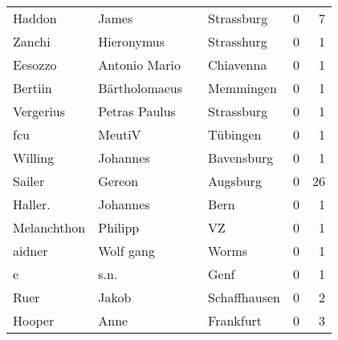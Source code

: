 \begin{tabular}{llllrr}
                   Haddon &                              James &             &                                  Strassburg &          0 &         7 \\
                   Zanchi &                         Hieronymus &             &                                  Strasshurg &          0 &         1 \\
                  Eesozzo &                      Antonio Mario &             &                                   Chiavenna &          0 &         1 \\
                  Bertiin &                      Bärtholomaeus &             &                                   Memmingen &          0 &         1 \\
                Vergerius &                      Petras Paulus &             &                                  Strassburg &          0 &         1 \\
                      fcu &                             MeutiV &             &                                    Tübingen &          0 &         1 \\
                  Willing &                           Johannes &             &                                  Bavensburg &          0 &         1 \\
                   Sailer &                             Gereon &             &                                    Augsburg &          0 &        26 \\
                  Haller. &                           Johannes &             &                                        Bern &          0 &         1 \\
              Melanchthon &                            Philipp &             &                                          VZ &          0 &         1 \\
                   aidner &                          Wolf gang &             &                                       Worms &          0 &         1 \\
                        e &                               s.n. &             &                                        Genf &          0 &         1 \\
                     Ruer &                              Jakob &             &                                Schaffhausen &          0 &         2 \\
                   Hooper &                               Anne &             &                                   Frankfurt &          0 &         3 \\

\end{tabular}
